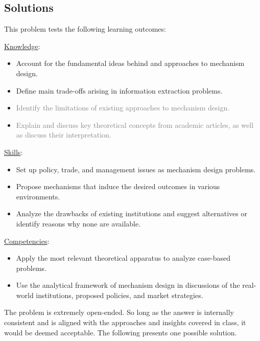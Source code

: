 \documentclass[a4paper]{article}
\newif\ifsolutions
\begin{document}
\ifsolutions
\subsection*{Solutions}
	This problem tests the following learning outcomes:
	\begin{framed}
		\underline{Knowledge}:
		\begin{itemize}[$\circ$]
			\item {Account for the fundamental ideas behind and approaches to mechanism design.}
			\item {Define main trade-offs arising in information extraction problems.}
			\item \textcolor{gray}{Identify the limitations of existing approaches to mechanism design.}
			\item \textcolor{gray}{Explain and discuss key theoretical concepts from academic articles, as well as discuss their interpretation.}
		\end{itemize}
		\underline{Skills}:
		\begin{itemize}[$\circ$]
			\item {Set up policy, trade, and management issues as mechanism design problems.}
			\item {Propose mechanisms that induce the desired outcomes in various environments.}
			\item {Analyze the drawbacks of existing institutions and suggest alternatives or identify reasons why none are available.}
		\end{itemize}
		\underline{Competencies}:
		\begin{itemize}[$\circ$]
			\item {Apply the most relevant theoretical apparatus to analyze case-based problems.}
			\item {Use the analytical framework of mechanism design in discussions of the real-world institutions, proposed policies, and market strategies.}
		\end{itemize}
	\end{framed}

	The problem is extremely open-ended. So long as the answer is internally consistent and is aligned with the approaches and insights covered in class, it would be deemed acceptable. The following presents one possible solution.
	
\end{document}

